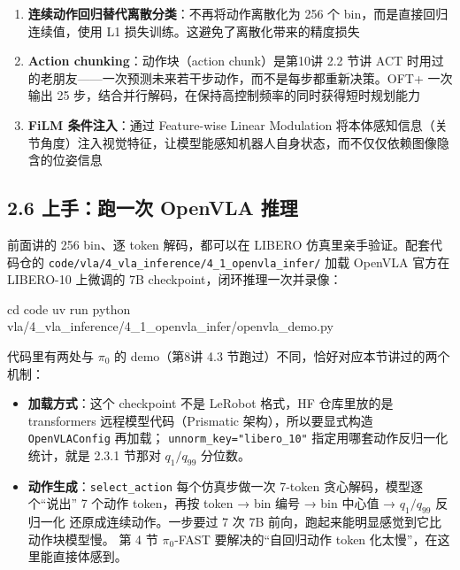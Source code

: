 \documentclass[
  chinese,
]{ctexart}
\newenvironment{Shaded}{\begin{snugshade}}{\end{snugshade}}
\newcommand{\BuiltInTok}[1]{\textcolor[rgb]{0.00,0.23,0.31}{#1}}
\newcommand{\ExtensionTok}[1]{\textcolor[rgb]{0.00,0.23,0.31}{#1}}
\newcommand{\NormalTok}[1]{\textcolor[rgb]{0.00,0.23,0.31}{#1}}
\providecommand{\tightlist}{%
  \setlength{\itemsep}{0pt}\setlength{\parskip}{0pt}}
\begin{document}
\begin{enumerate}
\def\labelenumi{\arabic{enumi}.}
\setcounter{enumi}{1}
\item
  \textbf{连续动作回归替代离散分类}：不再将动作离散化为 256 个
  bin，而是直接回归连续值，使用 L1
  损失训练。这避免了离散化带来的精度损失
\item
  \textbf{Action chunking}：动作块（action chunk）是第10讲 2.2 节讲 ACT
  时用过的老朋友------一次预测未来若干步动作，而不是每步都重新决策。OFT+
  一次输出 25 步，结合并行解码，在保持高控制频率的同时获得短时规划能力
\item
  \textbf{FiLM 条件注入}：通过 Feature-wise Linear Modulation
  将本体感知信息（关节角度）注入视觉特征，让模型能感知机器人自身状态，而不仅仅依赖图像隐含的位姿信息
\end{enumerate}

\subsection{2.6 上手：跑一次 OpenVLA
推理}\label{ux4e0aux624bux8dd1ux4e00ux6b21-openvla-ux63a8ux7406}

前面讲的 256 bin、逐 token 解码，都可以在 LIBERO
仿真里亲手验证。配套代码仓的
\texttt{code/vla/4\_vla\_inference/4\_1\_openvla\_infer/} 加载 OpenVLA
官方在 LIBERO-10 上微调的 7B checkpoint，闭环推理一次并录像：

\begin{Shaded}
\begin{Highlighting}[]
\BuiltInTok{cd}\NormalTok{ code}
\ExtensionTok{uv}\NormalTok{ run python vla/4\_vla\_inference/4\_1\_openvla\_infer/openvla\_demo.py}
\end{Highlighting}
\end{Shaded}

代码里有两处与 \(\pi_0\) 的 demo（第8讲 4.3
节跑过）不同，恰好对应本节讲过的两个机制：

\begin{itemize}
\tightlist
\item
  \textbf{加载方式}：这个 checkpoint 不是 LeRobot 格式，HF 仓库里放的是
  transformers 远程模型代码（Prismatic 架构），所以要显式构造
  \texttt{OpenVLAConfig} 再加载； \texttt{unnorm\_key="libero\_10"}
  指定用哪套动作反归一化统计，就是 2.3.1 节那对 \(q_1/q_{99}\) 分位数。
\item
  \textbf{动作生成}：\texttt{select\_action} 每个仿真步做一次 7-token
  贪心解码，模型逐个``说出'' 7 个动作 token，再按 token → bin 编号 → bin
  中心值 → \(q_1/q_{99}\) 反归一化 还原成连续动作。一步要过 7 次 7B
  前向，跑起来能明显感觉到它比动作块模型慢。 第 4 节 \(\pi_0\)-FAST
  要解决的``自回归动作 token 化太慢''，在这里能直接体感到。
\end{itemize}
\end{document}
